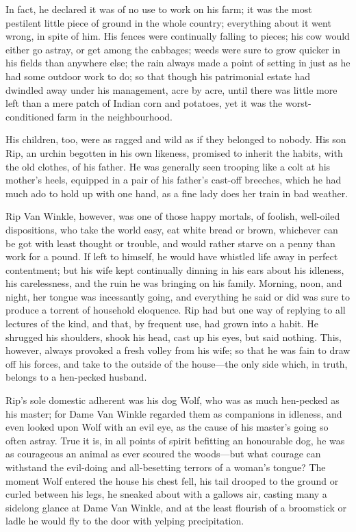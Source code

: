 In fact, he declared it was of no use to work on his farm; it was the most pestilent little piece of ground in the whole country; everything about it went wrong, in spite of him. His fences were continually falling to pieces; his cow would either go astray, or get among the cabbages; weeds were sure to grow quicker in his fields than anywhere else; the rain always made a point of setting in just as he had some outdoor work to do; so that though his patrimonial estate had dwindled away under his management, acre by acre, until there was little more left than a mere patch of Indian corn and potatoes, yet it was the worst-conditioned farm in the neighbourhood.

His children, too, were as ragged and wild as if they belonged to nobody. His son Rip, an urchin begotten in his own likeness, promised to inherit the habits, with the old clothes, of his father. He was generally seen trooping like a colt at his mother’s heels, equipped in a pair of his father’s cast-off breeches, which he had much ado to hold up with one hand, as a fine lady does her train in bad weather.

Rip Van Winkle, however, was one of those happy mortals, of foolish, well-oiled dispositions, who take the world easy, eat white bread or brown, whichever can be got with least thought or trouble, and would rather starve on a penny than work for a pound. If left to himself, he would have whistled life away in perfect contentment; but his wife kept continually dinning in his ears about his idleness, his carelessness, and the ruin he was bringing on his family. Morning, noon, and night, her tongue was incessantly going, and everything he said or did was sure to produce a torrent of household eloquence. Rip had but one way of replying to all lectures of the kind, and that, by frequent use, had grown into a habit. He shrugged his shoulders, shook his head, cast up his eyes, but said nothing. This, however, always provoked a fresh volley from his wife; so that he was fain to draw off his forces, and take to the outside of the house—the only side which, in truth, belongs to a hen-pecked husband.

Rip’s sole domestic adherent was his dog Wolf, who was as much hen-pecked as his master; for Dame Van Winkle regarded them as companions in idleness, and even looked upon Wolf with an evil eye, as the cause of his master’s going so often astray. True it is, in all points of spirit befitting an honourable dog, he was as courageous an animal as ever scoured the woods—but what courage can withstand the evil-doing and all-besetting terrors of a woman’s tongue? The moment Wolf entered the house his chest fell, his tail drooped to the ground or curled between his legs, he sneaked about with a gallows air, casting many a sidelong glance at Dame Van Winkle, and at the least flourish of a broomstick or ladle he would fly to the door with yelping precipitation.

